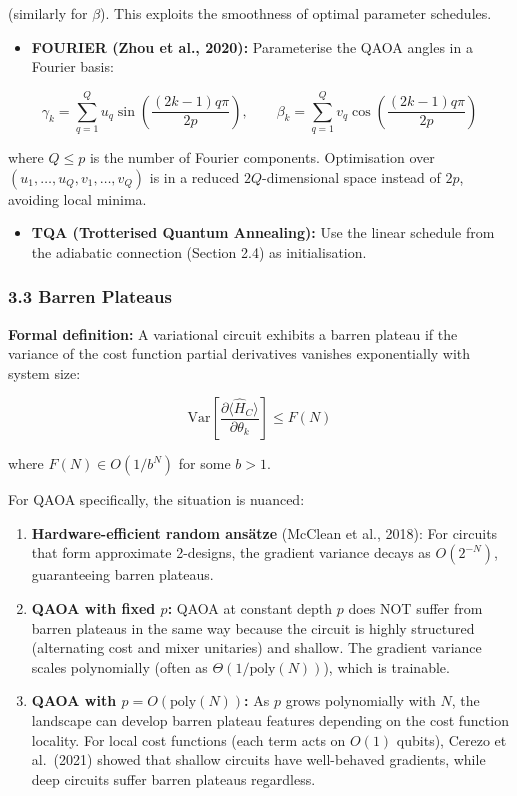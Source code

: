 \documentclass[
  11pt,
]{report}
\providecommand{\tightlist}{%
  \setlength{\itemsep}{0pt}\setlength{\parskip}{0pt}}
\begin{document}
(similarly for \(\beta\)). This exploits the smoothness of optimal
parameter schedules.

\begin{itemize}
\tightlist
\item
  \textbf{FOURIER (Zhou et al., 2020):} Parameterise the QAOA angles in
  a Fourier basis:
\end{itemize}

\[\gamma_k = \sum_{q=1}^{Q} u_q \sin\!\left(\frac{(2k-1)q\pi}{2p}\right), \qquad \beta_k = \sum_{q=1}^{Q} v_q \cos\!\left(\frac{(2k-1)q\pi}{2p}\right)\]

where \(Q \leq p\) is the number of Fourier components. Optimisation
over \((u_1, \ldots, u_Q, v_1, \ldots, v_Q)\) is in a reduced
\(2Q\)-dimensional space instead of \(2p\), avoiding local minima.

\begin{itemize}
\tightlist
\item
  \textbf{TQA (Trotterised Quantum Annealing):} Use the linear schedule
  from the adiabatic connection (Section 2.4) as initialisation.
\end{itemize}

\subsubsection{3.3 Barren Plateaus}\label{barren-plateaus}

\textbf{Formal definition:} A variational circuit exhibits a barren
plateau if the variance of the cost function partial derivatives
vanishes exponentially with system size:

\[\text{Var}\!\left[\frac{\partial \langle \hat{H}_C \rangle}{\partial \theta_k}\right] \leq F(N)\]

where \(F(N) \in O(1/b^N)\) for some \(b > 1\).

For QAOA specifically, the situation is nuanced:

\begin{enumerate}
\def\labelenumi{\arabic{enumi}.}
\item
  \textbf{Hardware-efficient random ansätze} (McClean et al., 2018): For
  circuits that form approximate 2-designs, the gradient variance decays
  as \(O(2^{-N})\), guaranteeing barren plateaus.
\item
  \textbf{QAOA with fixed \(p\):} QAOA at constant depth \(p\) does NOT
  suffer from barren plateaus in the same way because the circuit is
  highly structured (alternating cost and mixer unitaries) and shallow.
  The gradient variance scales polynomially (often as
  \(\Theta(1/\text{poly}(N))\)), which is trainable.
\item
  \textbf{QAOA with \(p = O(\text{poly}(N))\):} As \(p\) grows
  polynomially with \(N\), the landscape can develop barren plateau
  features depending on the cost function locality. For local cost
  functions (each term acts on \(O(1)\) qubits), Cerezo et al.~(2021)
  showed that shallow circuits have well-behaved gradients, while deep
  circuits suffer barren plateaus regardless.
\end{enumerate}
\end{document}
